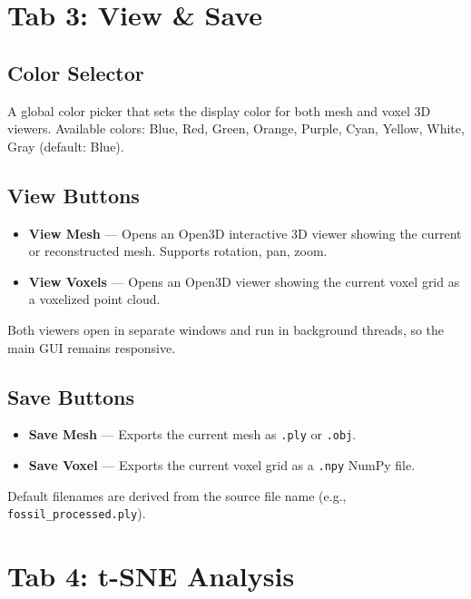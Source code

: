 \documentclass[12pt,a4paper]{article}
\begin{document}
\section{Tab 3: View \& Save}

\subsection{Color Selector}

A global color picker that sets the display color for both mesh and voxel 3D viewers. Available colors: Blue, Red, Green, Orange, Purple, Cyan, Yellow, White, Gray (default: Blue).

\subsection{View Buttons}

\begin{itemize}
  \item \textbf{View Mesh} --- Opens an Open3D interactive 3D viewer showing the current or reconstructed mesh. Supports rotation, pan, zoom.
  \item \textbf{View Voxels} --- Opens an Open3D viewer showing the current voxel grid as a voxelized point cloud.
\end{itemize}

Both viewers open in separate windows and run in background threads, so the main GUI remains responsive.

\subsection{Save Buttons}

\begin{itemize}
  \item \textbf{Save Mesh} --- Exports the current mesh as \texttt{.ply} or \texttt{.obj}.
  \item \textbf{Save Voxel} --- Exports the current voxel grid as a \texttt{.npy} NumPy file.
\end{itemize}

Default filenames are derived from the source file name (e.g., \texttt{fossil\_processed.ply}).

\section{Tab 4: t-SNE Analysis}
\end{document}
